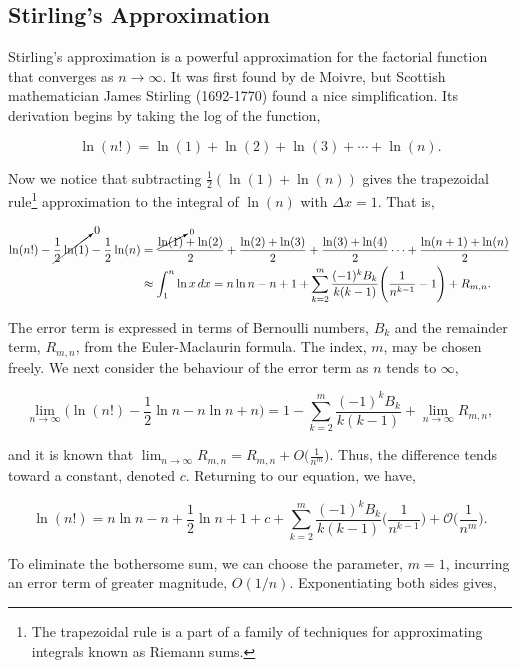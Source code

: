 \documentclass[11pt]{amsart}
\begin{document}
\subsection{Stirling's Approximation}

Stirling's approximation is a powerful approximation for the factorial function that converges as $n \to \infty$. It was first found by de Moivre, but Scottish mathematician James Stirling (1692-1770) found a nice simplification. Its derivation begins by taking the log of the function,

$$\ln(n!) = \ln(1) + \ln(2) + \ln(3) + \cdots + \ln(n).$$

Now we notice that subtracting $\frac{1}{2}(\ln(1) + \ln(n))$ gives the trapezoidal rule\footnote{The trapezoidal rule is a part of a family of techniques for approximating integrals known as Riemann sums.} approximation to the integral of $\ln(n)$ with $\Delta x = 1$. That is,

\begin{align}
\ln(n!) - \cancelto{0}{\frac{1}{2}\ln(1)} - \frac{1}{2}\ln(n) &= \frac{\cancelto{0}{\ln(1)} + \ln(2)}{2} + \frac{\ln(2) + \ln(3)}{2} + \frac{\ln(3) + \ln(4)}{2} \cdots + \frac{\ln(n + 1) + \ln(n)}{2} \notag \\
&\approx \int_{1}^{n} \ln{x} \mathop{dx} = n\ln n - n + 1 + \sum_{k=2}^{m} \frac{(-1)^kB_k}{k(k-1)}\Bigg(\frac{1}{n^{k-1}} - 1\Bigg) + R_{m,n}. \notag
\end{align}

The error term is expressed in terms of Bernoulli numbers, $B_k$ and the remainder term, $R_{m,n}$, from the Euler-Maclaurin formula. The index, $m$, may be chosen freely. We next consider the behaviour of the error term as $n$ tends to $\infty$,

$$\lim_{n \to \infty}\Big(\ln(n!) - \frac{1}{2}\ln n - n\ln n + n\Big) = 1 - \sum_{k=2}^{m} \frac{(-1)^kB_k}{k(k-1)} + \lim_{n \to \infty}R_{m,n},$$

and it is known that $\lim_{n \to \infty}R_{m,n} = R_{m,n} + O\Big(\frac{1}{n^m}\Big)$. Thus, the difference tends toward a constant, denoted $c$. Returning to our equation, we have,

$$\ln(n!) = n\ln n - n + \frac{1}{2}\ln n + 1 + c + \sum_{k=2}^{m} \frac{(-1)^kB_k}{k(k-1)}\Bigg(\frac{1}{n^{k-1}}\Bigg) + \mathcal{O}\Bigg(\frac{1}{n^m}\Bigg).$$

To eliminate the bothersome sum, we can choose the parameter, $m = 1$, incurring an error term of greater magnitude, $O(1/n)$. Exponentiating both sides gives,
\end{document}
